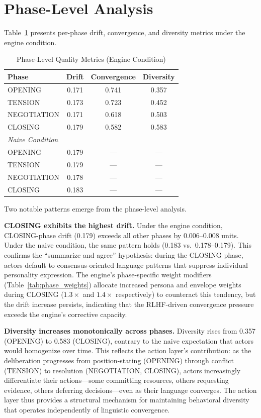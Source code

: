 \section{Phase-Level Analysis}

Table~\ref{tab:phase} presents per-phase drift, convergence, and diversity metrics under the engine condition.

\begin{table}[t]
\centering
\caption{Phase-Level Quality Metrics (Engine Condition)}
\label{tab:phase}
\begin{tabular}{lccc}
\toprule
Phase & Drift & Convergence & Diversity \\
\midrule
OPENING     & 0.171 & 0.741 & 0.357 \\
TENSION     & 0.173 & 0.723 & 0.452 \\
NEGOTIATION & 0.171 & 0.618 & 0.503 \\
CLOSING     & 0.179 & 0.582 & 0.583 \\
\midrule
\multicolumn{4}{l}{\textit{Naive Condition}} \\
OPENING     & 0.179 & --- & --- \\
TENSION     & 0.179 & --- & --- \\
NEGOTIATION & 0.178 & --- & --- \\
CLOSING     & 0.183 & --- & --- \\
\bottomrule
\end{tabular}
\end{table}

Two notable patterns emerge from the phase-level analysis.

\textbf{CLOSING exhibits the highest drift.} Under the engine condition, CLOSING-phase drift (0.179) exceeds all other phases by 0.006--0.008 units. Under the naive condition, the same pattern holds (0.183 vs.\ 0.178--0.179). This confirms the ``summarize and agree'' hypothesis: during the CLOSING phase, actors default to consensus-oriented language patterns that suppress individual personality expression. The engine's phase-specific weight modifiers (Table~\ref{tab:phase_weights}) allocate increased persona and envelope weights during CLOSING ($1.3\times$ and $1.4\times$ respectively) to counteract this tendency, but the drift increase persists, indicating that the RLHF-driven convergence pressure exceeds the engine's corrective capacity.

\textbf{Diversity increases monotonically across phases.} Diversity rises from 0.357 (OPENING) to 0.583 (CLOSING), contrary to the naive expectation that actors would homogenize over time. This reflects the action layer's contribution: as the deliberation progresses from position-stating (OPENING) through conflict (TENSION) to resolution (NEGOTIATION, CLOSING), actors increasingly differentiate their actions---some committing resources, others requesting evidence, others deferring decisions---even as their language converges. The action layer thus provides a structural mechanism for maintaining behavioral diversity that operates independently of linguistic convergence.



